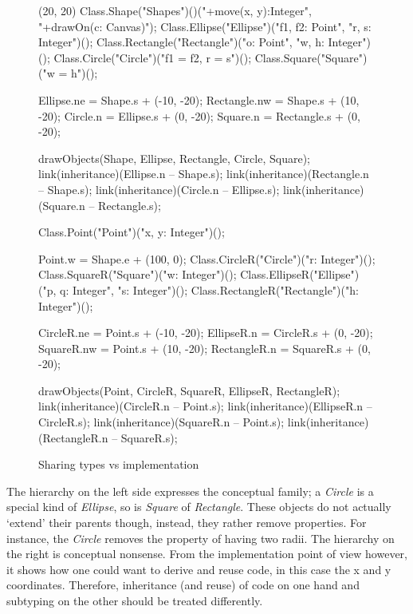\begin{figure}[H]
	\centering
	\begin{emp}[classdiag](20, 20)
		Class.Shape("Shapes")()("+move(x, y):Integer", "+drawOn(c: Canvas)");
		Class.Ellipse("Ellipse")("f1, f2: Point", "r, s: Integer")();
		Class.Rectangle("Rectangle")("o: Point", "w, h: Integer")();
		Class.Circle("Circle")("{f1 = f2, r = s}")();
		Class.Square("Square")("{w = h}")();

		Ellipse.ne = Shape.s + (-10, -20);
		Rectangle.nw = Shape.s + (10, -20);
		Circle.n = Ellipse.s + (0, -20);
		Square.n = Rectangle.s + (0, -20);

		drawObjects(Shape, Ellipse, Rectangle, Circle, Square);
		link(inheritance)(Ellipse.n -- Shape.s);
		link(inheritance)(Rectangle.n -- Shape.s);
		link(inheritance)(Circle.n -- Ellipse.s);
		link(inheritance)(Square.n -- Rectangle.s);

		Class.Point("Point")("x, y: Integer")();

		Point.w = Shape.e + (100, 0);
		Class.CircleR("Circle")("r: Integer")();
		Class.SquareR("Square")("w: Integer")();
		Class.EllipseR("Ellipse")("p, q: Integer", "s: Integer")();
		Class.RectangleR("Rectangle")("h: Integer")();

		CircleR.ne = Point.s + (-10, -20);
		EllipseR.n = CircleR.s + (0, -20);
		SquareR.nw = Point.s + (10, -20);
		RectangleR.n = SquareR.s + (0, -20);

		drawObjects(Point, CircleR, SquareR, EllipseR, RectangleR);
		link(inheritance)(CircleR.n -- Point.s);
		link(inheritance)(EllipseR.n -- CircleR.s);
		link(inheritance)(SquareR.n -- Point.s);
		link(inheritance)(RectangleR.n -- SquareR.s);
	\end{emp}
	\caption{Sharing types vs implementation}
	\label{fig:implementationConflict}
\end{figure}

The hierarchy on the left side expresses the conceptual family; a
\emph{Circle} is a special kind of \emph{Ellipse}, so is \emph{Square}
of \emph{Rectangle}. These objects do not actually `extend' their
parents though, instead, they rather remove properties. For instance,
the \emph{Circle} removes the property of having two radii. The hierarchy
on the right is conceptual nonsense. From the implementation point of
view however, it shows how one could want to derive and reuse code, in
this case the x and y coordinates. Therefore, inheritance (and reuse) of
code on one hand and subtyping on the other should be treated differently.

